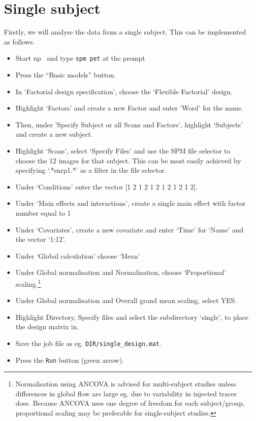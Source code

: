 \section{Single subject}

Firstly, we will analyse the data from a single subject. This can be implemented as follows.
\begin{itemize}
\item{Start up \matlab\ and type \texttt{spm pet} at the prompt}
\item{Press the ``Basic models'' button.}
\item{In `Factorial design specification', choose the `Flexible Factorial' design.}
\item{Highlight `Factors' and create a new Factor and enter 'Word' for the name.}
\item{Then, under 'Specify Subject or all Scans and Factors', highlight `Subjects' and create a new subject.}
\item{Highlight `Scans', select `Specify Files' and use the SPM file selector to choose the 12 images for that subject. This can be most easily achieved by specifying `.*snrp1.*' as a filter in the file selector.}
\item{Under `Conditions' enter the vector [1 2 1 2 1 2 1 2 1 2 1 2].}
\item{Under `Main effects and interactions', create a single main effect with factor number equal to 1}
\item{Under `Covariates', create a new covariate and enter `Time' for `Name' and the vector `1:12'.}
\item{Under `Global calculation' choose `Mean'}
\item{Under Global normalisation and Normalisation, choose `Proportional' scaling.\footnote{Normalisation using ANCOVA is advised for multi-subject studies unless differences in global flow are large eg. due to variability in injected tracer dose. Because ANCOVA uses one degree of freedom for each subject/group, proportional scaling may be preferable for single-subject studies.}}
\item{Under Global normalisation and Overall grand mean scaling, select YES.}
\item{Highlight Directory, Specify files and select the subdirectory `single', to place the design matrix in.}
\item{Save the job file as eg. \texttt{DIR/single\_design.mat}.}
\item{Press the \texttt{Run} button (green arrow).}
\end{itemize}
